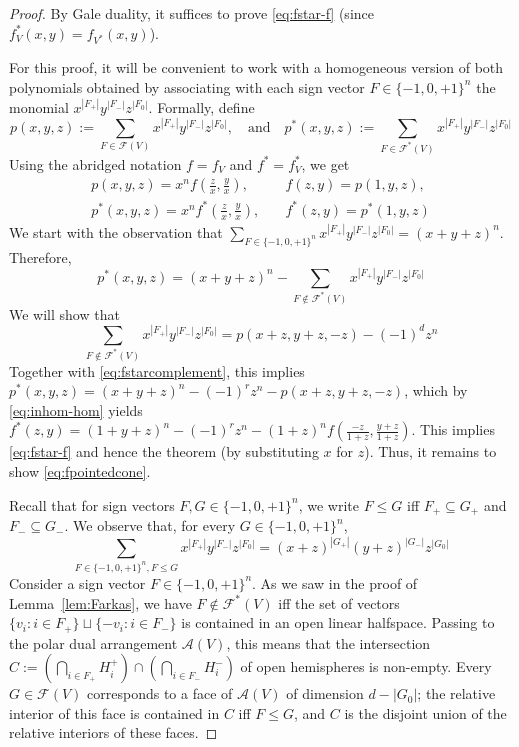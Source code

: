 \documentclass[a4paper,USenglish,cleveref, autoref, thm-restate,nolineno]{socg-lipics-v2021}
\newcommand{\arr}{\mathcal{A}}
\newcommand{\fhom}{p}
\renewcommand{\leq}{\leqslant}
\begin{document}
\begin{proof} By Gale duality, it suffices to prove \eqref{eq:fstar-f} (since $f^*_V(x,y)=f_{V^*}(x,y)$).

For this proof, it will be convenient to work with a homogeneous version of both polynomials obtained by associating with each sign vector $F\in \{-1,0,+1\}^n$ the monomial $x^{|F_+|}y^{|F_-|}z^{|F_0|}$. Formally, 
define
\[
\fhom(x,y,z):=\sum_{F\in \mathcal{F}(V)} x^{|F_+|}y^{|F_-|}z^{|F_0|}, \quad \textrm{and}\quad 
\fhom^*(x,y,z):=\sum_{F\in \mathcal{F}^*(V)} x^{|F_+|}y^{|F_-|}z^{|F_0|} 
\]
Using the abridged notation $f=f_V$ and $f^*=f^*_V$, 
we get 
\begin{equation}
\label{eq:inhom-hom}
\begin{split}
\textstyle \fhom(x,y,z) = x^n f(\frac{z}{x}, \frac{y}{x}),\quad &f(z,y)=\fhom(1,y,z), \\
\textstyle \fhom^*(x,y,z) = x^n f^*(\frac{z}{x},\frac{y}{x}),\quad &f^*(z,y)=\fhom^*(1,y,z)
\end{split}
\end{equation}
We start with the observation that $\sum_{F\in \{-1,0,+1\}^n} x^{|F_+|} y^{|F_-|} z^{|F_0|}= (x+y+z)^n$. Therefore, 
\begin{equation}
\label{eq:fstarcomplement}
\fhom^*(x,y,z) =(x+y+z)^n - \sum_{F \not\in \mathcal{F}^*(V)} x^{|F_+|} y^{|F_-|} z^{|F_0|}
\end{equation}
We will show that
\begin{equation}
\label{eq:fpointedcone}
\sum_{F \not\in \mathcal{F}^*(V)} x^{|F_+|} y^{|F_-|} z^{|F_0|} = p(x+z,y+z,-z) -(-1)^d z^n
\end{equation}
Together with \eqref{eq:fstarcomplement}, this implies $\fhom^*(x,y,z) = (x+y+z)^n -(-1)^rz^n - \fhom(x+z,y+z,-z)$, which by \eqref{eq:inhom-hom} yields $f^*(z,y)=(1+y+z)^n -(-1)^r z^n - (1+z)^n f(\frac{-z}{1+z},\frac{y+z}{1+z})$. This implies \eqref{eq:fstar-f} and hence the theorem (by substituting $x$ for $z$). Thus, it remains to show \eqref{eq:fpointedcone}.

Recall that for sign vectors $F,G \in \{-1,0,+1\}^n$, we write $F\leq G$ iff $F_+ \subseteq G_+$ and $F_- \subseteq G_-$. 
We observe that, for every $G \in \{-1,0,+1\}^n$,
\begin{equation}
\label{eq:superfaces}
\sum_{F\in \{-1,0,+1\}^n, F\leq G} x^{|F_+|} y^{|F_-|} z^{|F_0|}=(x+z)^{|G_+|} (y+z)^{|G_-|}z^{|G_0|}
\end{equation}
Consider a sign vector $F\in \{-1,0,+1\}^n$. As we saw in the proof of Lemma~\ref{lem:Farkas}, we have $F\not \in \mathcal{F}^*(V)$ iff the set of vectors $\{v_i \colon i\in F_+\} \sqcup \{-v_i \colon i\in F_-\}$ is contained in an open linear halfspace. Passing to the polar dual arrangement $\arr(V)$, this means that the intersection  $C:=(\bigcap_{i \in F_+} H_i^+) \cap (\bigcap_{i \in F_-} H_i^-)$ of open hemispheres is non-empty.
Every $G\in \mathcal{F}(V)$ corresponds to a face of $\arr(V)$ of dimension $d-|G_0|$; the relative interior of this face is contained in $C$ iff $F\leq G$, and $C$ is the disjoint union of the relative interiors of these faces. 


\end{proof}
\end{document}
